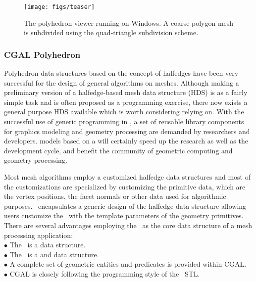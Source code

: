 \documentclass[letter,twocolumn]{article}
\begin{document}
\begin{figure}[htb]
  \centering
  \texttt{[image: figs/teaser]}
  \caption{The polyhedron viewer running on Windows. A coarse polygon 
    mesh is subdivided using the quad-triangle subdivision scheme.}
  \label{fig:viewer}
\end{figure}


\subsubsection*{CGAL Polyhedron}

Polyhedron data structures based on the concept of halfedges have been
very successful for the design of general algorithms on meshes.
Although making a preliminary version of a halfedge-based mesh data
structure (HDS) is as a fairly simple task and is often proposed as a
programming exercise, there now exists a general purpose HDS available
which is worth considering relying on. With the successful use of
generic programming in \CC , a set of reusable library components for
graphics modeling and geometry processing are demanded by researchers
and developers.  models based on a
will certainly speed up the research as well as the development cycle,
and benefit the community of geometric computing and geometry
processing.

Most mesh algorithms employ a customized halfedge data structures and
most of the customizations are specialized by customizing the
primitive data, which are the vertex positions, the facet normals or
other data used for algorithmic purposes. \cgalpoly\ encapsulates a
generic design of the halfedge data structure allowing users customize
the \poly\ with the template parameters of the geometry
primitives. There are several advantages employing the \poly\ as the
core data structure of a mesh processing application: \\

\indent $\bullet$ The \poly\ is a  data structure.\\
\indent $\bullet$ The \poly\ is a  and  
                  data structure.\\
\indent $\bullet$ A complete set of geometric entities and predicates
                  is provided within CGAL.\\
\indent $\bullet$ CGAL is closely following the programming 
                  style of the \CC\ STL.
\end{document}
